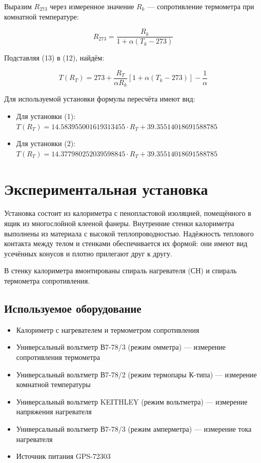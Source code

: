 \documentclass{article}
\begin{document}
	Выразим $R_{273}$ через измеренное значение $R_k$ — сопротивление термометра при комнатной температуре:
	
	\begin{equation}
		R_{273} = \frac{R_k}{1 + \alpha(T_k - 273)} \tag{13}
	\end{equation}
	
	Подставляя (13) в (12), найдём:
	
	\begin{equation}
		T(R_T) = 273 + \frac{R_T}{\alpha R_k}[1 + \alpha(T_k - 273)] - \frac{1}{\alpha} \tag{14}
	\end{equation}
	
	Для используемой установки формулы пересчёта имеют вид:
	\begin{itemize}
		\item Для установки (1): $T(R_T) = 14.583955001619313455 \cdot R_T + 39.35514018691588785$
		\item Для установки (2): $T(R_T) = 14.377980252039598845 \cdot R_T + 39.35514018691588785$
	\end{itemize}
	
	\section*{Экспериментальная установка}
	
	Установка состоит из калориметра с пенопластовой изоляцией, помещённого в ящик из многослойной клееной фанеры. Внутренние стенки калориметра выполнены из материала с высокой теплопроводностью. Надёжность теплового контакта между телом и стенками обеспечивается их формой: они имеют вид усечённых конусов и плотно прилегают друг к другу.
	
	В стенку калориметра вмонтированы спираль нагревателя (СН) и спираль термометра сопротивления.
	
	\subsection*{Используемое оборудование}
	
	\begin{itemize}
		\item Калориметр с нагревателем и термометром сопротивления
		\item Универсальный вольтметр В7-78/3 (режим омметра) — измерение сопротивления термометра
		\item Универсальный вольтметр В7-78/2 (режим термопары К-типа) — измерение комнатной температуры
		\item Универсальный вольтметр KEITHLEY (режим вольтметра) — измерение напряжения нагревателя
		\item Универсальный вольтметр В7-78/3 (режим амперметра) — измерение тока нагревателя
		\item Источник питания GPS-72303
	\end{itemize}
	
\end{document}
